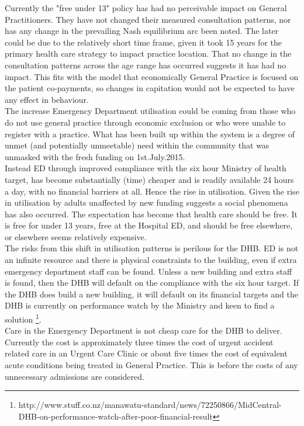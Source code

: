 \documentclass[11pt,a4paper]{article}
\begin{document}
Currently the "free under 13" policy has had no perceivable impact on General Practitioners. They have not changed their measured consultation patterns, nor has any change in the prevailing Nash equilibrium arc been noted. The later could be due to the relatively short time frame, given it took 15 years for the primary health care strategy to impact practice location. That no change in the consultation patterns across the age range has occurred suggests it has had no impact. This fits with the model that economically General Practice is focused on the patient co-payments, so changes in capitation would not be expected to have any effect in behaviour.\\

The increase Emergency Department utilisation could be coming from those who do not use general practice through economic exclusion or who were unable to register with a practice. What has been built up within the system is a degree of unmet (and potentially unmeetable) need within the community that was unmasked with the fresh funding on 1st.July.2015.\\

Instead ED through improved compliance with the six hour Ministry of health target, has become substantially (time) cheaper and is readily available 24 hours a day, with no financial barriers at all. Hence the rise in utilisation. Given the rise in utilisation by adults unaffected by new funding suggests a social phenomena has also occurred. The expectation has become that health care should be free. It is free for under 13 years, free at the Hospital ED, and should be free elsewhere, or elsewhere seems relatively expensive. \\

The risks from this shift in utilisation patterns is perilous for the DHB. ED is not an infinite resource and there is physical constraints to the building, even if extra emergency department staff can be found. Unless a new building and extra staff is found, then the DHB will default on the compliance with the six hour target. If the DHB does build a new building, it will default on its financial targets and the DHB is currently on performance watch by the Ministry and keen to find a solution \footnote{http://www.stuff.co.nz/manawatu-standard/news/72250866/MidCentral-DHB-on-performance-watch-after-poor-financial-result}. \\

Care in the Emergency Department is not cheap care for the DHB to deliver. Currently the cost is approximately three times the cost of urgent accident related care in an Urgent Care Clinic or about five times the cost of equivalent acute conditions being treated in General Practice. This is before the costs of any unnecessary admissions are considered.\\
\end{document}
